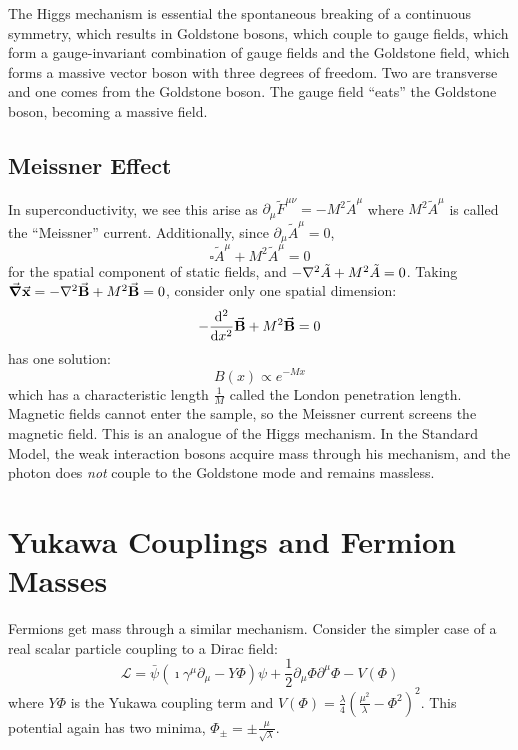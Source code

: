 \documentclass[a4paper,twoside,master.tex]{subfiles}
\begin{document}
The Higgs mechanism is essential the spontaneous breaking of a continuous symmetry, which results in Goldstone bosons, which couple to gauge fields, which form a gauge-invariant combination of gauge fields and the Goldstone field, which forms a massive vector boson with three degrees of freedom. Two are transverse and one comes from the Goldstone boson. The gauge field ``eats'' the Goldstone boson, becoming a massive field.

\subsection{Meissner Effect}\label{sub:meissner_effect}

In superconductivity, we see this arise as $ \partial_{\mu} \tilde{F}^{\mu \nu} = - M^2 \tilde{A}^{\mu} $ where $ M^2 \tilde{A}^{\mu} $ is called the ``Meissner'' current. Additionally, since $ \partial_{\mu} \tilde{A}^{\mu} = 0 $,
\begin{equation}
    \square \tilde{A}^{\mu} + M^2 \tilde{A}^{\mu} = 0
\end{equation}
for the spatial component of static fields, and $ - \laplacian{\tilde{A}} + M^2 \tilde{A} = 0 $. Taking $ \grad{\va{x}} = - \laplacian{\va{B}} + M^2 \va{B} = 0 $, consider only one spatial dimension:
\begin{equation}
    - \dv[2]{x} \va{B} + M^2 \va{B} = 0
\end{equation}
has one solution:
\begin{equation}
    B(x) \propto e^{-M x}
\end{equation}
which has a characteristic length $ \frac{1}{M} $ called the London penetration length. Magnetic fields cannot enter the sample, so the Meissner current screens the magnetic field. This is an analogue of the Higgs mechanism. In the Standard Model, the weak interaction bosons acquire mass through his mechanism, and the photon does \textit{not} couple to the Goldstone mode and remains massless.


\section{Yukawa Couplings and Fermion Masses}\label{sec:yukawa_couplings_and_fermion_masses}

Fermions get mass through a similar mechanism. Consider the simpler case of a real scalar particle coupling to a Dirac field:
\begin{equation}
    \mathcal{L} = \bar{\psi} (\imath \gamma^{\mu} \partial_{\mu} - Y \Phi) \psi + \frac{1}{2} \partial_{\mu} \Phi \partial^{\mu} \Phi - V(\Phi)
\end{equation}
where $ Y \Phi $ is the Yukawa coupling term and $ V(\Phi) = \frac{\lambda}{4} \left( \frac{\mu^2}{\lambda} - \Phi^2 \right)^2 $. This potential again has two minima, $ \Phi_{\pm} = \pm \frac{\mu}{\sqrt{\lambda}} $.
\end{document}
